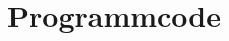 \documentclass[12pt,        %
  english,ngerman,          %
  paper=a4,                 %
  captions=tablesignature,  %
  listof=numbered,          %
  bibliography=totoc,       %
  headings=small,           %
  headinclude=false,        %
  footinclude=false,        %
  parskip=half-,            %
  oneside,                  %
  DIV=12                    %
  ]{styles/colidok}
\begin{document}

\section{Programmcode}\label{sec:appendix_code}

  
\end{document}
